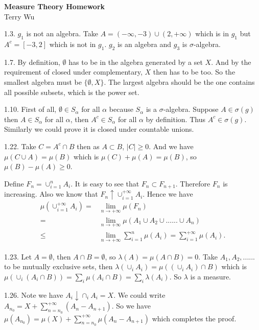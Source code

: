 \documentclass[14pt]{extreport}
\begin{document}
\begin{center}
\large{\textbf{Measure Theory Homework}}
~\\
Terry Wu
\end{center}
\begin{spacing}{1.5}
1.3. $g_1$ is not an algebra. Take $A=(-\infty,-3) \cup (2,+\infty)$ which is in $g_1$ but $A^c=[-3,2]$ which is not in $g_1$. $g_2$ is an algebra and $g_3$ is $\sigma$-algebra.

1.7. By definition, $\emptyset$ has to be in the algebra generated by a set $X$. And by the requirement of closed under complementary, $X$ then has to be too. So the smallest algebra must be $\{\emptyset, X\}$. The largest algebra should be the one contains all possible subsets, which is the power set.

1.10. First of all, $\emptyset \in S_{\alpha}$ for all $\alpha$ because $S_{\alpha}$ is a $\sigma$-algebra. Suppose $A\in \sigma(g)$ then $A\in S_{\alpha}$ for all $\alpha$, then $A^c\in S_{\alpha}$ for all $\alpha$ by definition. Thus $A^c \in \sigma(g)$. Similarly we could prove it is closed under countable unions. 

1.22. Take $C=A^c\cap B$ then as $A\subset B$, $|C|\geq 0$. And we have $\mu(C \cup A)=\mu(B)$ which is $\mu(C)+\mu(A)=\mu(B)$, so $\mu(B)-\mu(A)\geq 0$. 

Define $F_n=\cup_{i=1}^{n}A_i$. It is easy to see that $F_n\subset F_{n+1}$. Therefore $F_n$ is increasing. Also we know that $F_n \uparrow \cup_{i=1}^{+\infty}A_i$. Hence we have
\begin{align*}
\mu(\cup_{i=1}^{+\infty}A_i)=&\lim_{n\rightarrow +\infty}\mu(F_n)\\
=&\lim_{n\rightarrow +\infty}\mu(A_1\cup A_2\cup......\cup A_n)\\
\leq & \lim_{n\rightarrow +\infty} \sum_{i=1}^{n}\mu(A_i)=  \sum_{i=1}^{+\infty}\mu(A_i).
\end{align*}

1.23. Let $A=\emptyset$, then $A\cap B=\emptyset$, so $\lambda(A)=\mu(A\cap B)=0.$ Take $A_1, A_2, ......$ to be mutually exclusive sets, then $\lambda(\cup_i A_i)=\mu((\cup_i A_i)\cap B)$ which is $\mu(\cup_i (A_i\cap B))=\sum_i \mu(A_i\cap B)=\sum_i \lambda(A_i)$. So $\lambda$ is a measure. 

1.26. Note we have $A_i \downarrow \cap_i A_i=X$. We could write $A_{n_0}=X+\sum_{n=n_0}^{+\infty}(A_{n}-A_{n+1})$. So we have $\mu(A_{n_0})=\mu(X)+\sum_{n=n_0}^{+\infty}\mu(A_n-A_{n+1})$ which completes the proof.


\end{spacing}
\end{document}
